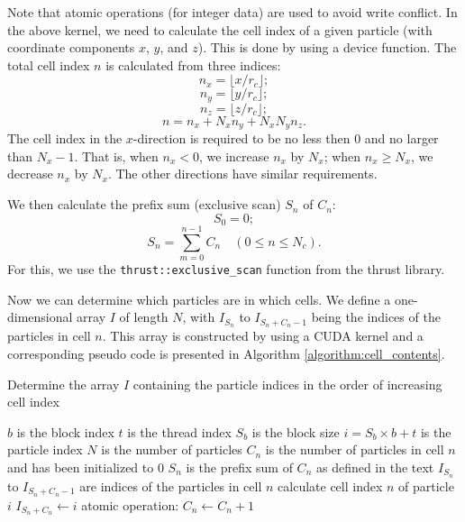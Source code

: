 \documentclass[12pt,a4paper]{report}
\begin{document}
Note that atomic operations (for integer data) are used to avoid write conflict. In the above kernel, we need to calculate the cell index of a given particle (with coordinate components $x$, $y$, and $z$). This is done by using a device function. The total cell index $n$ is calculated from three indices:
\begin{equation}
n_x = \lfloor x / r_c \rfloor;
\end{equation}
\begin{equation}
n_y = \lfloor y / r_c \rfloor;
\end{equation}
\begin{equation}
n_z = \lfloor z / r_c \rfloor;
\end{equation}
\begin{equation}
n = n_x + N_x n_y + N_x N_y n_z.
\end{equation}
The cell index in the $x$-direction is required to be no less then 0 and no larger than $N_x-1$. That is, when $n_x < 0$, we increase $n_x$ by $N_x$; when $n_x \geq N_x$, we decrease $n_x$ by $N_x$. The other directions have similar requirements.

We then calculate the prefix sum (exclusive scan) $S_n$ of $C_n$:
\begin{equation}
S_0 = 0;
\end{equation}
\begin{equation}
S_n = \sum_{m=0}^{n-1} C_n \quad (0 \leq n \leq N_c).
\end{equation}
For this, we use the \verb"thrust::exclusive_scan" function from the thrust library.

Now we can determine which particles are in which cells. We define a one-dimensional array $I$ of length $N$, with $I_{S_n}$ to $I_{S_n + C_n - 1}$ being the indices of the particles in cell $n$. This array is constructed by using a CUDA kernel and a corresponding pseudo code is presented in Algorithm \ref{algorithm:cell_contents}.

\begin{algorithm}[htbp]
\caption{Determine the array $I$  containing the particle indices in the order of increasing cell index}
\label{algorithm:cell_contents}
\begin{algorithmic}[1]
\Require $b$ is the block index
\Require $t$ is the thread index
\Require $S_b$ is the block size
\Require $i=S_b\times b+t$ is the particle index
\Require $N$ is the number of particles
\Require $C_n$ is the number of particles in cell $n$ and has been initialized to 0
\Require $S_n$ is the prefix sum of $C_n$ as defined in the text
\Require $I_{S_n}$ to $I_{S_n + C_n - 1}$ are indices of the particles in cell $n$
	\State calculate cell index $n$ of particle $i$
    \State $I_{S_n + C_n} \leftarrow i$
	\State atomic operation: $C_n \leftarrow C_n +1$
\EndIf
 \end{algorithmic}
\end{algorithm}
\end{document}
